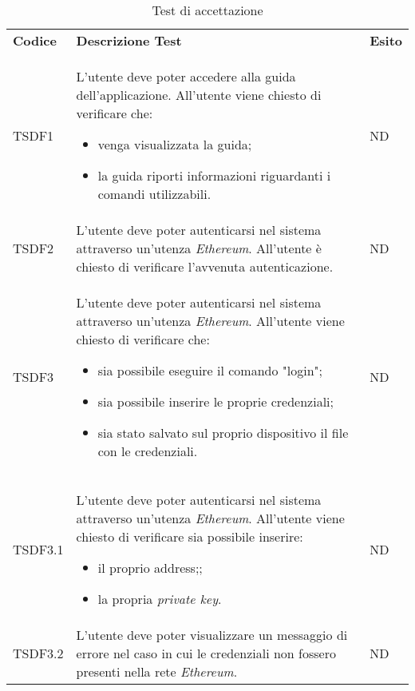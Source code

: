 \renewcommand{\arraystretch}{2.2}
\begin{longtable}{|C{2cm}|C{8cm}|C{2cm}|}
	
	\caption{Test di accettazione }\\
	\hline
	
	\textbf{Codice} & \textbf{Descrizione Test}  & \textbf{Esito}
	\tabularnewline
	\endfirsthead
	
	TSDF1 &
	L’utente deve poter accedere alla guida dell’applicazione. All’utente viene chiesto di veriﬁcare che: 
	\begin{itemize}
		\item venga visualizzata la guida;
		\item la guida riporti informazioni riguardanti i comandi utilizzabili.
	\end{itemize} &
	ND \\
	
	TSDF2  &
	L’utente deve poter autenticarsi nel sistema attraverso un'utenza \textit{Ethereum\glos}.
	All’utente è chiesto di veriﬁcare l’avvenuta autenticazione. &
	ND \\
	
	TSDF3 &
	L’utente deve poter autenticarsi nel sistema attraverso un'utenza \textit{Ethereum\glos}. All’utente viene chiesto di veriﬁcare che: 
	\begin{itemize}
		\item sia possibile eseguire il comando "login";
		\item sia possibile inserire le proprie credenziali;
		\item sia stato salvato sul proprio dispositivo il file con le credenziali.
	\end{itemize} &
	ND \\
	
	TSDF3.1 &
	L’utente deve poter autenticarsi nel sistema attraverso un'utenza \textit{Ethereum\glos}. All’utente viene chiesto di verificare sia possibile inserire: 
	\begin{itemize}
		\item il proprio address;;
		\item la propria \textit{private key\glos}.
	\end{itemize} &
	ND \\
	
	TSDF3.2 &
	L’utente deve poter visualizzare un messaggio di errore nel caso in cui le credenziali non fossero	presenti nella rete \textit{Ethereum\glo}. &
	ND \\
	

\end{longtable}
